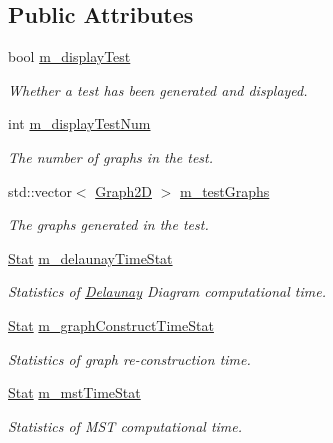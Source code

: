 \subsection*{Public Attributes}
\begin{DoxyCompactItemize}
\item 
bool \hyperlink{structcmst_1_1_window_1_1_test_a6e01140b018e7c479b15ae6499d8b9e8}{m\+\_\+display\+Test}
\begin{DoxyCompactList}\small\item\em Whether a test has been generated and displayed. \end{DoxyCompactList}\item 
int \hyperlink{structcmst_1_1_window_1_1_test_a0968826c727c33df28c160c4095e0b2f}{m\+\_\+display\+Test\+Num}
\begin{DoxyCompactList}\small\item\em The number of graphs in the test. \end{DoxyCompactList}\item 
std\+::vector$<$ \hyperlink{classcmst_1_1_graph2_d}{Graph2D} $>$ \hyperlink{structcmst_1_1_window_1_1_test_a42f44814c524399a3c1f547a64218c1a}{m\+\_\+test\+Graphs}
\begin{DoxyCompactList}\small\item\em The graphs generated in the test. \end{DoxyCompactList}\item 
\hyperlink{classcmst_1_1_stat}{Stat} \hyperlink{structcmst_1_1_window_1_1_test_a6f0ad01079d1c5b149282e31db771772}{m\+\_\+delaunay\+Time\+Stat}
\begin{DoxyCompactList}\small\item\em Statistics of \hyperlink{class_delaunay}{Delaunay} Diagram computational time. \end{DoxyCompactList}\item 
\hyperlink{classcmst_1_1_stat}{Stat} \hyperlink{structcmst_1_1_window_1_1_test_a4ff72191889ff43d7d80517120a97fae}{m\+\_\+graph\+Construct\+Time\+Stat}
\begin{DoxyCompactList}\small\item\em Statistics of graph re-\/construction time. \end{DoxyCompactList}\item 
\hyperlink{classcmst_1_1_stat}{Stat} \hyperlink{structcmst_1_1_window_1_1_test_a103594f227a761c33c06b8dd68713c18}{m\+\_\+mst\+Time\+Stat}
\begin{DoxyCompactList}\small\item\em Statistics of M\+ST computational time. \end{DoxyCompactList}\end{DoxyCompactItemize}


